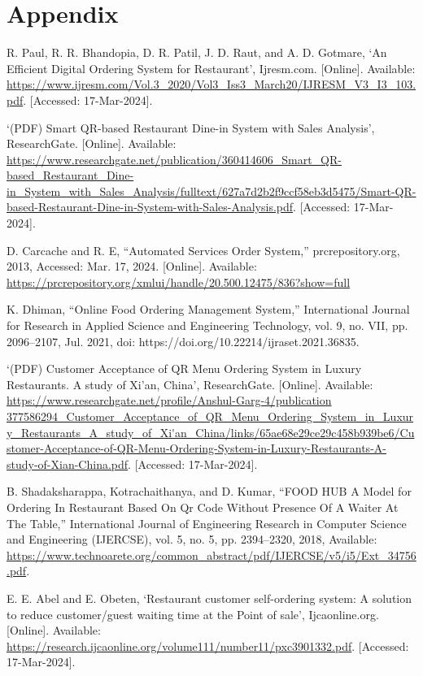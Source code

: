 \documentclass{report}
\begin{document}
\chapter{Appendix}

\begin{thebibliography}{}
     R. Paul, R. R. Bhandopia, D. R. Patil, J. D. Raut, and A. D. Gotmare, ‘An Efficient Digital Ordering System for Restaurant’, Ijresm.com. [Online]. Available: \url{https://www.ijresm.com/Vol.3_2020/Vol3_Iss3_March20/IJRESM_V3_I3_103.pdf}. [Accessed: 17-Mar-2024].

     ‘(PDF) Smart QR-based Restaurant Dine-in System with Sales Analysis’, ResearchGate. [Online]. Available: \url {https://www.researchgate.net/publication/360414606_Smart_QR-based_Restaurant_Dine-in_System_with_Sales_Analysis/fulltext/627a7d2b2f9ccf58eb3d5475/Smart-QR-based-Restaurant-Dine-in-System-with-Sales-Analysis.pdf}. [Accessed: 17-Mar-2024].

    D. Carcache and R. E, “Automated Services Order System,” prcrepository.org, 2013, Accessed: Mar. 17, 2024. [Online]. Available: \url {https://prcrepository.org/xmlui/handle/20.500.12475/836?show=full}

     K. Dhiman, “Online Food Ordering Management System,” International Journal for Research in Applied Science and Engineering Technology, vol. 9, no. VII, pp. 2096–2107, Jul. 2021, doi: {https://doi.org/10.22214/ijraset.2021.36835}.
    
     ‘(PDF) Customer Acceptance of QR Menu Ordering System in Luxury Restaurants. A study of Xi’an, China’, ResearchGate. [Online]. Available: \url{https://www.researchgate.net/profile/Anshul-Garg-4/publication 377586294_Customer_Acceptance_of_QR_Menu_Ordering_System_in_Luxury_Restaurants_A_study_of_Xi'an_China/links/65ae68e29ce29c458b939be6/Customer-Acceptance-of-QR-Menu-Ordering-System-in-Luxury-Restaurants-A-study-of-Xian-China.pdf}. [Accessed: 17-Mar-2024].

    B. Shadaksharappa, Kotrachaithanya, and D. Kumar, “FOOD HUB A Model for Ordering In Restaurant Based On Qr Code Without Presence Of A Waiter At The Table,” International Journal of Engineering Research in Computer Science and Engineering (IJERCSE), vol. 5, no. 5, pp. 2394–2320, 2018, Available: \url{https://www.technoarete.org/common_abstract/pdf/IJERCSE/v5/i5/Ext_34756.pdf}.

    E. E. Abel and E. Obeten, ‘Restaurant customer self-ordering system: A solution to reduce customer/guest waiting time at the Point of sale’, Ijcaonline.org. [Online]. Available: \url{https://research.ijcaonline.org/volume111/number11/pxc3901332.pdf}. [Accessed: 17-Mar-2024].



\end{thebibliography}
\end{document}
